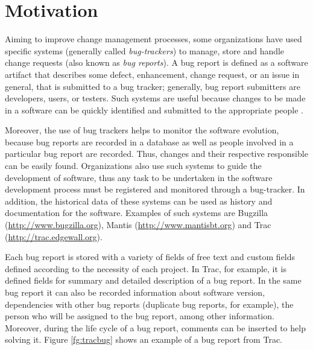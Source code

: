 \section{Motivation}
\label{sc:motivation}
Aiming to improve change management processes, some organizations have used
specific systems (generally called \emph{bug-trackers}) to manage, store and
handle change requests (also known as \emph{bug reports}). A bug report is
defined as a software artifact that describes some defect, enhancement, change
request, or an issue in general, that is submitted to a bug tracker;
generally, bug report submitters are developers, users, or testers. Such
systems are useful because changes to be made in a software can be quickly
identified and submitted to the appropriate people \citep{Anvik2005}.

Moreover, the use of bug trackers helps to monitor the software evolution,
because bug reports are recorded in a database as well as people involved
in a particular bug report are recorded. Thus, changes and their respective
responsible can be easily found. Organizations also use such systems to guide
the development of software, thus any task to be undertaken in the software
development process must be registered and monitored through a bug-tracker. In
addition, the historical data of these systems can be used as history and
documentation for the software. Examples of such systems are
Bugzilla (\url{http://www.bugzilla.org}), Mantis (\url{http://www.mantisbt.org})
and Trac (\url{http://trac.edgewall.org}).

Each bug report is stored with a variety of fields of free text and custom
fields defined according to the necessity of each project. In Trac, for
example, it is defined fields for summary and detailed description of a
bug report. In the same bug report it can also be recorded information about
software version, dependencies with other bug reports (duplicate bug reports,
for example), the person who will be assigned to the bug report, among other
information. Moreover, during the life cycle of a bug report, comments can
be inserted to help solving it. Figure \ref{fg:tracbug} shows an example of a
bug report from Trac.

